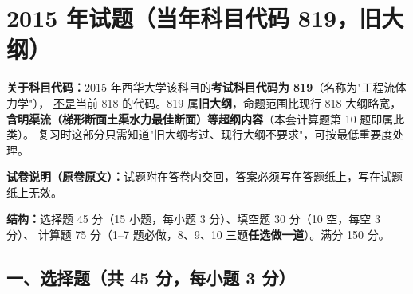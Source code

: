 \chapter{2015 年试题（当年科目代码 819，旧大纲）}

\begin{tishi}
\textbf{关于科目代码：}2015 年西华大学该科目的\textbf{考试科目代码为 819}（名称为"工程流体力学"），
\underline{不是}当前 818 的代码。819 属\textbf{旧大纲}，命题范围比现行 818 大纲略宽，
\textbf{含明渠流（梯形断面土渠水力最佳断面）等超纲内容}（本套计算题第 10 题即属此类）。
复习时这部分只需知道"旧大纲考过、现行大纲不要求"，可按最低重要度处理。

\textbf{试卷说明（原卷原文）：}试题附在答卷内交回，答案必须写在答题纸上，写在试题纸上无效。

\textbf{结构：}选择题 45 分（15 小题，每小题 3 分）、填空题 30 分（10 空，每空 3 分）、
计算题 75 分（1--7 题必做，8、9、10 三题\textbf{任选做一道}）。满分 150 分。
\end{tishi}

\section{一、选择题（共 45 分，每小题 3 分）}


